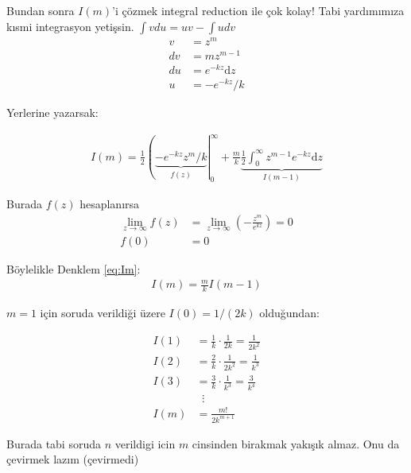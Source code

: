 \documentclass{article}
\numberwithin{equation}{section}
\begin{document}
Bundan sonra $I(m)$'i çözmek integral reduction ile çok kolay! Tabi yardımımıza kısmi integrasyon yetişsin. $\int vdu = uv - \int udv$
\begin{align}
    v &= z^m \\
    dv&= mz^{m-1} \\
    du&= e^{-kz}\mathrm{d}z \\
    u &= -e^{-kz}/k 
\end{align}

Yerlerine yazarsak:

\begin{align}
    \label{eq:Im}
    I(m) = \frac{1}{2}\left(\underbrace{-e^{-kz}z^m/k}_{f(z)}\right|_0^\infty + \frac{m}{k}\underbrace{\frac{1}{2}\int_0^\infty z^{m-1}e^{-kz}\mathrm{d}z}_{I(m-1)} 
\end{align}

Burada $f(z)$ hesaplanırsa 
\begin{align}
\lim_{z \to \infty} f(z) &= \lim_{z \to \infty} \left(-\frac{z^m}{e^{kz}}\right) = 0 \\
f(0) &= 0 
\end{align}


Böylelikle Denklem \eqref{eq:Im}: 
\begin{align}
    I(m) = \frac{m}{k} I(m-1) 
\end{align}

$m=1$ için soruda verildiği üzere $I(0) = 1/(2k)$ olduğundan: 

\begin{align}
    I(1) &= \frac{1}{k} \cdot \frac{1}{2k} = \frac{1}{2k^2} \\
    I(2) &= \frac{2}{k} \cdot \frac{1}{2k^2} = \frac{1}{k^3} \\
    I(3) &= \frac{3}{k} \cdot \frac{1}{k^3} = \frac{3}{k^4} \\
      & \;\;\vdots \\
    I(m) &= \frac{m!}{2k^{m+1}} 
\end{align}

Burada tabi soruda $n$ verildigi icin $m$ cinsinden birakmak yakışık almaz. Onu da çevirmek lazım (çevirmedi)
\end{document}
